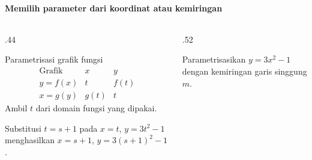 \documentclass{../../kalkulus-ppt}
\begin{document}
\begin{frame}{\insertsection}
    \framesubtitle{Memilih parameter dari koordinat atau kemiringan}
    \begin{columns}[T,onlytextwidth]
        \begin{column}{.44\textwidth}
            \begin{block}{Parametrisasi grafik fungsi}
                \[
                    \begin{array}{c|cc}
                        \text{Grafik} & x & y\\ \hline
                        y=f(x) & t & f(t)\\
                        x=g(y) & g(t) & t
                    \end{array}
                \]
                Ambil $t$ dari domain fungsi yang dipakai.
            \end{block}
            Substitusi $t=s+1$ pada $x=t$, $y=3t^2-1$
            menghasilkan $x=s+1$, $y=3(s+1)^2-1$.
        \end{column}
        \begin{column}{.52\textwidth}
            \begin{contoh}
                Parametrisasikan $y=3x^2-1$ dengan
                kemiringan garis singgung $m$.
            \end{contoh}
        \end{column}
    \end{columns}
\end{frame}
\end{document}
